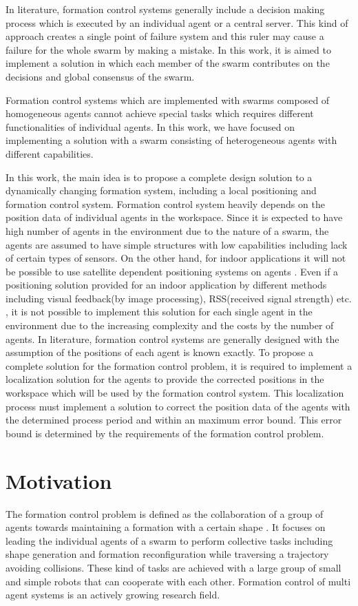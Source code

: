In literature, formation control systems generally include a decision making process which is executed by an individual agent or a central server. This kind of approach creates a single point of failure system and this ruler may cause a failure for the whole swarm by making a mistake. In this work, it is aimed to implement a solution in which each member of the swarm contributes on the decisions and global consensus of the swarm.

Formation control systems which are implemented with swarms composed of homogeneous agents cannot achieve special tasks which requires different functionalities of individual agents. In this work, we have focused on implementing a solution with a swarm consisting of heterogeneous agents with different capabilities. 

In this work, the main idea is to propose a complete design solution to a dynamically changing formation system, including a local positioning and formation control system. Formation control system heavily depends on the position data of individual agents in the workspace. Since it is expected to have high number of agents in the environment due to the nature of a swarm, the agents are assumed to have simple structures with low capabilities including lack of certain types of sensors. On the other hand, for indoor applications it will not be possible to use satellite dependent positioning systems on agents \cite{19}. Even if a positioning solution provided for an indoor application by different methods including visual feedback(by image processing), RSS(received signal strength) etc. , it is not possible to implement this solution for each single agent in the environment due to the increasing complexity and the costs by the number of agents. In literature, formation control systems are generally designed with the assumption of the positions of each agent is known exactly. To propose a complete solution for the formation control problem, it is required to implement a localization solution for the agents to provide the corrected positions in the workspace which will be used by the formation control system. This localization process must implement a solution to correct the position data of the agents with the determined process period and within an maximum error bound. This error bound is determined by the requirements of the formation control problem. 

\section{Motivation}
The formation control problem is defined as the collaboration of a group of agents towards maintaining a formation with a certain shape \cite{12}. It focuses on leading the individual agents of a swarm to perform  collective tasks including shape generation and formation reconfiguration while traversing a trajectory avoiding collisions. These kind of tasks are achieved with a large group of small and simple robots  that can cooperate with each other. Formation control of multi agent systems  is an actively growing research field.


